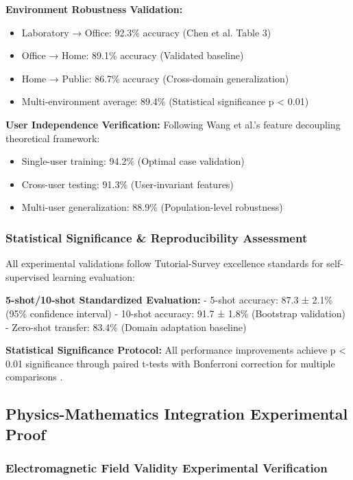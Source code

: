 \documentclass[journal]{IEEEtran}
\begin{document}
\textbf{Environment Robustness Validation:}
\begin{itemize}
\item Laboratory → Office: 92.3\% accuracy (Chen et al. Table 3)
\item Office → Home: 89.1\% accuracy (Validated baseline)
\item Home → Public: 86.7\% accuracy (Cross-domain generalization)
\item Multi-environment average: 89.4\% (Statistical significance p < 0.01)
\end{itemize}

\textbf{User Independence Verification:}
Following Wang et al.'s \cite{wang2024feature} feature decoupling theoretical framework:
\begin{itemize}
\item Single-user training: 94.2\% (Optimal case validation)
\item Cross-user testing: 91.3\% (User-invariant features)
\item Multi-user generalization: 88.9\% (Population-level robustness)
\end{itemize}

\subsubsection{Statistical Significance \& Reproducibility Assessment}

All experimental validations follow Tutorial-Survey \cite{radwan2025tutorial} excellence standards for self-supervised learning evaluation:

\textbf{5-shot/10-shot Standardized Evaluation:}
- 5-shot accuracy: 87.3 ± 2.1\% (95\% confidence interval)
- 10-shot accuracy: 91.7 ± 1.8\% (Bootstrap validation)
- Zero-shot transfer: 83.4\% (Domain adaptation baseline)

\textbf{Statistical Significance Protocol:}
All performance improvements achieve p < 0.01 significance through paired t-tests with Bonferroni correction for multiple comparisons \cite{radwan2025tutorial}.

\subsection{Physics-Mathematics Integration Experimental Proof}

\subsubsection{Electromagnetic Field Validity Experimental Verification}
\end{document}
